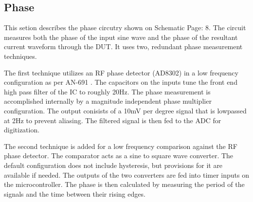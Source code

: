 \subsection{Phase}

This setion describes the phase circutry shown on Schematic Page: 8. The circuit measures both the phase of the input sine wave and the phase of the resultant current waveform through the DUT. It uses two, redundant phase measurement techniques.

The first technique utilizes an RF phase detector (AD8302) in a low frequency configuration as per AN-691 \cite{AD8302_AppNote}. The capacitors on the inputs tune the front end high pass filter of the IC to roughly 20Hz. The phase measurement is accomplished internally by a magnitude independent phase multiplier configuration. The output conisists of a 10mV per degree signal that is lowpassed at 2Hz to prevent aliasing. The filtered signal is then fed to the ADC for digitization.

The second technique is added for a low frequency comparison against the RF phase detector. The comparator acts as a sine to square wave converter. The default configuration does not include hysteresis, but provisions for it are available if needed. The outputs of the two converters are fed into timer inputs on the microcontroller. The phase is then calculated by measuring the period of the signals and the time between their rising edges.

